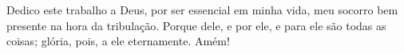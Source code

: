 \begin{dedicatoria}
   \vspace*{\fill}
   \begin{flushright}
     Dedico este trabalho a Deus, por ser essencial em minha vida, meu socorro bem presente na hora da tribulação. 
     Porque dele, e por ele, e para ele são todas as coisas; glória, pois, a ele eternamente. Amém!

   \end{flushright}
   \vspace*{\fill}
\end{dedicatoria}
